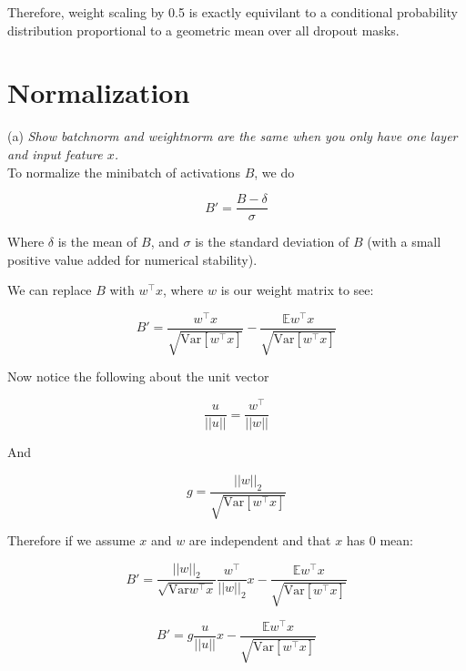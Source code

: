 \documentclass{amsart}
\theoremstyle{definition}
\theoremstyle{remark}
\numberwithin{equation}{section}
\begin{document}
Therefore, weight scaling by 0.5 is exactly equivilant to a conditional
probability distribution proportional to a geometric mean over all dropout masks.

\section{Normalization}

(a) \textit{Show batchnorm and weightnorm are the same when you only have one
layer and input feature $x$.}\\

To normalize the minibatch of activations $B$, we do

\begin{equation}
B' = \frac{B - \delta}{\sigma}
\end{equation}

Where $\delta$ is the mean of $B$, and $\sigma$ is the standard deviation of $B$
(with a small positive value added for numerical stability).

We can replace $B$ with $w^\top x$, where $w$ is our weight matrix to see:

\begin{equation}
B' = \frac{w^\top x}{\sqrt{\mathrm{Var}[w^\top x]}} -
     \frac{\mathbb{E}w^\top x}{\sqrt{\mathrm{Var}[w^\top x]}}
\end{equation}

Now notice the following about the unit vector

\begin{equation}
\frac{u}{||u||} = \frac{w^\top}{||w||}
\end{equation}

And

\begin{equation}
g=\frac{||w||_2}{\sqrt{\mathrm{Var}[w^{\top}x]}}
\end{equation}

Therefore if we assume $x$ and $w$ are independent and that $x$ has 0 mean:

\begin{equation}
B' = \frac{||w||_2}{\sqrt{\mathrm{Var}w^{\top}x}} \frac{w^\top}{||w||_2}x -
     \frac{\mathbb{E}w^\top x}{\sqrt{\mathrm{Var}[w^{\top}x]}}
\end{equation}

\begin{equation}
B' = g \frac{u}{||u||}x - \frac{\mathbb{E}w^\top x}{\sqrt{\mathrm{Var}[w^{\top}x]}}
\end{equation}
\end{document}
